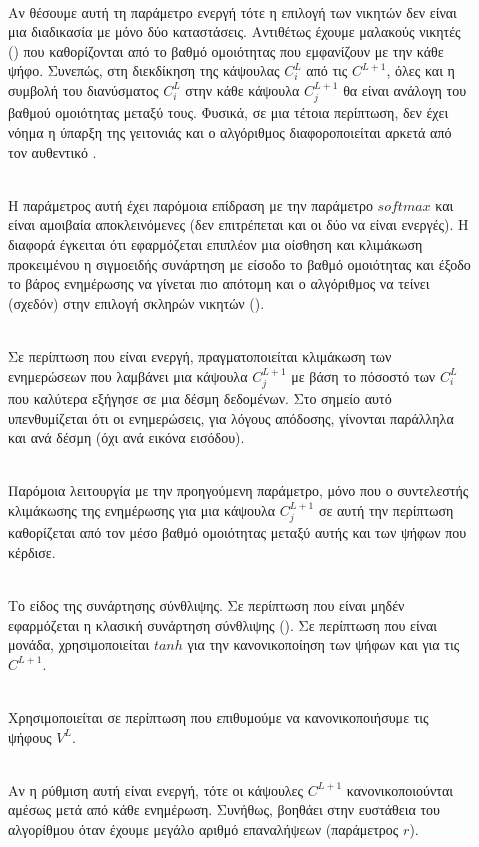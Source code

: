 \begin{description}
  \item[] \hfill \\ Αν θέσουμε αυτή τη παράμετρο ενεργή τότε η επιλογή των νικητών δεν είναι μια διαδικασία με μόνο δύο καταστάσεις. Αντιθέτως έχουμε μαλακούς νικητές () που καθορίζονται από το βαθμό ομοιότητας που εμφανίζουν με την κάθε ψήφο. Συνεπώς, στη διεκδίκηση της κάψουλας $C_i^L$ από τις $C^{L+1}$, όλες  και η συμβολή του διανύσματος  $C_i^L$ στην κάθε κάψουλα $C^{L+1}_j$ θα είναι ανάλογη του βαθμού ομοιότητας μεταξύ τους. Φυσικά, σε μια τέτοια περίπτωση, δεν έχει νόημα η ύπαρξη της γειτονιάς και ο αλγόριθμος διαφοροποιείται αρκετά από τον αυθεντικό .
  \item[] \hfill \\ Η παράμετρος αυτή έχει παρόμοια επίδραση με την παράμετρο $softmax$ και είναι αμοιβαία αποκλεινόμενες (δεν επιτρέπεται και οι δύο να είναι ενεργές). Η διαφορά έγκειται ότι εφαρμόζεται επιπλέον μια οίσθηση και κλιμάκωση προκειμένου η σιγμοειδής συνάρτηση με είσοδο το βαθμό ομοιότητας και έξοδο το βάρος ενημέρωσης να γίνεται πιο απότομη και ο αλγόριθμος να τείνει (σχεδόν) στην επιλογή σκληρών νικητών ().
  \item[] \hfill \\ Σε περίπτωση που είναι ενεργή, πραγματοποιείται κλιμάκωση των ενημερώσεων που λαμβάνει μια κάψουλα $C^{L+1}_j$ με βάση το πόσοστό των $C^L_i$ που καλύτερα εξήγησε σε μια δέσμη δεδομένων. Στο σημείο αυτό υπενθυμίζεται ότι οι ενημερώσεις, για λόγους απόδοσης, γίνονται παράλληλα και ανά δέσμη (όχι ανά εικόνα εισόδου).
  \item[] \hfill \\ Παρόμοια λειτουργία με την προηγούμενη παράμετρο, μόνο που ο συντελεστής κλιμάκωσης της ενημέρωσης για μια κάψουλα $C_j^{L+1}$ σε αυτή την περίπτωση καθορίζεται από τον μέσο βαθμό ομοιότητας μεταξύ αυτής και των ψήφων που κέρδισε.
  \item[] \hfill \\ Το είδος της συνάρτησης σύνθλιψης. Σε περίπτωση που είναι μηδέν εφαρμόζεται η κλασική συνάρτηση σύνθλιψης (). Σε περίπτωση που είναι μονάδα, χρησιμοποιείται $tanh$  για την κανονικοποίηση των ψήφων και  για τις $C^{L+1}$.
  \item[] \hfill \\ Χρησιμοποιείται σε περίπτωση που επιθυμούμε να κανονικοποιήσυμε τις ψήφους $V^L$.
  \item[] \hfill \\ Αν η ρύθμιση αυτή είναι ενεργή, τότε οι κάψουλες $C^{L+1}$ κανονικοποιούνται αμέσως μετά από κάθε ενημέρωση. Συνήθως, βοηθάει στην ευστάθεια του αλγορίθμου όταν έχουμε μεγάλο αριθμό επαναλήψεων (παράμετρος $r$).
\end{description}

